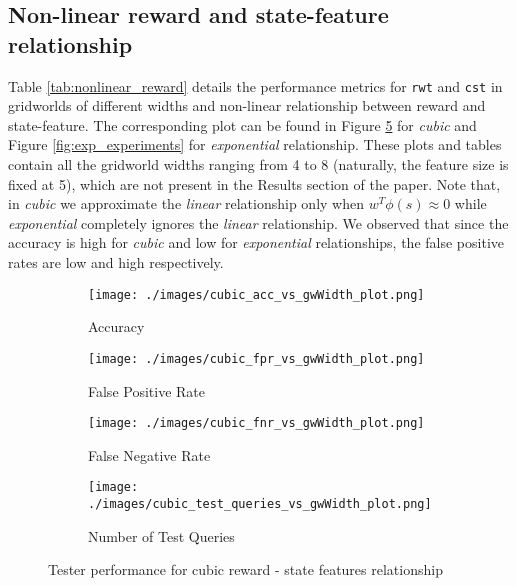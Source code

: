 \subsection{Non-linear reward and state-feature relationship}
Table \ref{tab:nonlinear_reward} details the performance metrics for \texttt{rwt} and \texttt{cst} in gridworlds of different widths and non-linear relationship between reward and state-feature. The corresponding plot can be found in Figure \ref{fig:cubic_experiments} for \textit{cubic} and Figure \ref{fig:exp_experiments} for \textit{exponential} relationship. These plots and tables contain all the gridworld widths ranging from 4 to 8 (naturally, the feature size is fixed at 5), which are not present in the Results section of the paper. Note that, in \textit{cubic} we approximate the \textit{linear} relationship only when $w^{T}\phi(s) \approx 0$ while \textit{exponential} completely ignores the \textit{linear} relationship. We observed that since the accuracy is high for \textit{cubic} and low for \textit{exponential} relationships, the false positive rates are low and high respectively.

\begin{figure}[!ht]
     \centering
     \begin{subfigure}[!ht]{0.4\textwidth}
         \centering
         \texttt{[image: ./images/cubic\_acc\_vs\_gwWidth\_plot.png]}
         \caption{Accuracy}
         \label{fig:cubic_acc_vs_features_plot_appendix}
     \end{subfigure}
    \hspace{5mm}
     \begin{subfigure}[!ht]{0.4\textwidth}
         \centering
         \texttt{[image: ./images/cubic\_fpr\_vs\_gwWidth\_plot.png]}
         \caption{False Positive Rate}
         \label{fig:cubic_fpr_vs_features_plot}
     \end{subfigure}
     \hspace{5mm}
     \begin{subfigure}[!ht]{0.4\textwidth}
         \centering
         \texttt{[image: ./images/cubic\_fnr\_vs\_gwWidth\_plot.png]}
         \caption{False Negative Rate}
         \label{fig:cubic_fnr_vs_features_plot}
     \end{subfigure}
     \hspace{5mm}
    \begin{subfigure}[!ht]{0.4\textwidth}
         \centering
         \texttt{[image: ./images/cubic\_test\_queries\_vs\_gwWidth\_plot.png]}
         \caption{Number of Test Queries}
         \label{fig:cubic_test_queries_vs_features_plot}
     \end{subfigure}
    \caption{Tester performance for cubic reward - state features relationship}
    \label{fig:cubic_experiments}
\end{figure}


